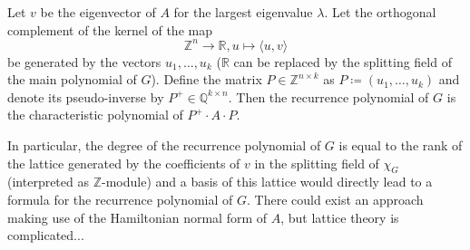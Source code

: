 \documentclass[a4paper,12pt]{article}
\begin{document}
\begin{lemma}
Let $v$ be the eigenvector of $A$ for the largest eigenvalue $\lambda$. Let the orthogonal complement of the kernel of the map 
$$
\mathbb{Z}^n \to \mathbb{R}, u \mapsto \langle u, v \rangle
$$
be generated by the vectors $u_1, \ldots, u_k$ ($\mathbb{R}$ can be replaced by the splitting field of the main polynomial of $G$).
Define the matrix $P\in\mathbb{Z}^{n \times k}$ as $P \coloneqq (u_1, \ldots, u_k)$ and denote its pseudo-inverse by $P^+ \in \mathbb{Q}^{k\times n}$. Then the recurrence polynomial of $G$ is the characteristic polynomial of $P^+ \cdot A \cdot P$.
\end{lemma}

In particular, the degree of the recurrence polynomial of $G$ is equal to the rank of the lattice generated by the coefficients of $v$ in the splitting field of $\chi_G$ (interpreted as $\mathbb{Z}$-module) and a basis of this lattice would directly lead to a formula for the recurrence polynomial of $G$. There could exist an approach making use of the Hamiltonian normal form of $A$, but lattice theory is complicated...
\end{document}
